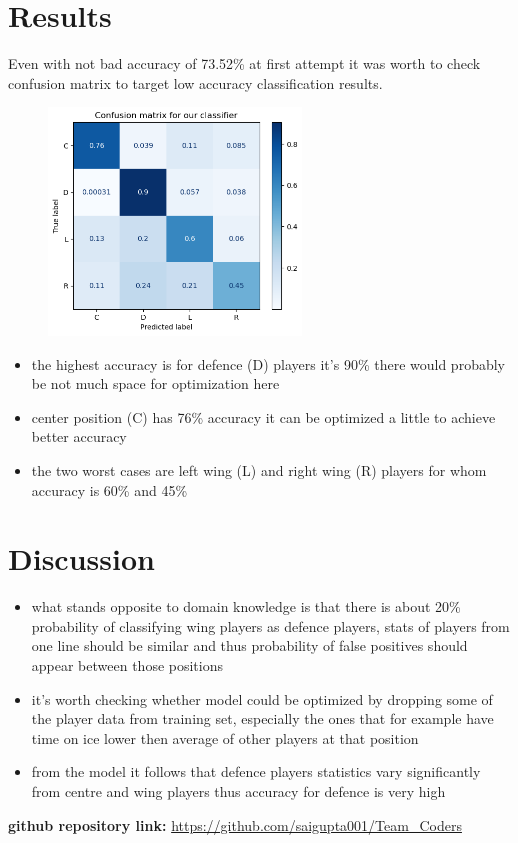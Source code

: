 \section{Results}
	Even with not bad accuracy of 73.52\% at first attempt it was worth to check confusion matrix to target low accuracy classification results.
	
	\begin{figure}[H]
        \includegraphics[width=0.6\textwidth]{matrix}
    \end{figure}
	
	\begin{itemize}
		\item the highest accuracy is for defence (D) players it's 90\% there would probably be not much space for optimization here
		\item center position (C) has 76\% accuracy it can be optimized a little to achieve better accuracy
		\item the two worst cases are left wing (L) and right wing (R) players for whom accuracy is 60\% and 45\%
	\end{itemize}
	
	\section{Discussion}
	\begin{itemize}
		\item what stands opposite to domain knowledge is that there is about 20\% probability of classifying wing players as defence players, stats of players from one line should be similar and thus probability of false positives should appear between those positions
		\item it's worth checking whether model could be optimized by dropping some of the player data from training set, especially the ones that for example have time on ice lower then average of other players at that position
		\item from the model it follows that defence players statistics vary significantly from centre and wing players thus accuracy for defence is very high
		
	\end{itemize}

	\textbf{github repository link:}
        \href{https://github.com/saigupta001/Team\_Coders}{https://github.com/saigupta001/Team\_Coders} 
